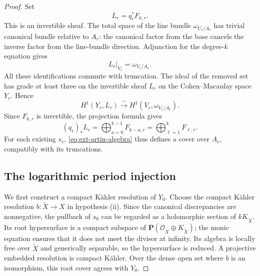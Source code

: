 \documentclass[11pt,a4paper]{article}
\theoremstyle{definition}\newtheorem{definition}[theorem]{Definition}
\theoremstyle{remark}\newtheorem*{remark}{Remark}
\newcommand{\OO}{\mathcal O}
\begin{document}
\begin{proof}
Set
\begin{equation}\label{eq:ext-top-line}
 L_r=q_r^*F_{k,r}.
\end{equation}
This is an invertible sheaf. The total space of the line bundle
$\omega_{U_r/A_r}$ has trivial canonical bundle relative to $A_r$:
the canonical factor from the base cancels the inverse factor from the
line-bundle direction. Adjunction for the degree-$k$ equation gives
\begin{equation}\label{eq:ext-adjunction}
 L_r|_{V_r}=\omega_{V_r/A_r}.
\end{equation}
All these identifications commute with truncation.
The ideal of the removed set has grade at least three on the invertible
sheaf $L_r$ on the Cohen--Macaulay space $Y_r$. Hence
\begin{equation}\label{eq:ext-depth-cover}
 H^1(Y_r,L_r)\xrightarrow{\ \sim\ }
 H^1(V_r,\omega_{V_r/A_r}).
\end{equation}
Since $F_{k,r}$ is invertible, the projection formula gives
\begin{equation}\label{eq:ext-top-direct-sum}
 (q_r)_*L_r
 =\bigoplus_{a=0}^{k-1}F_{k-a,r}
 =\bigoplus_{\ell=1}^{k}F_{\ell,r}.
\end{equation}
For each existing $s_r$, \eqref{eq:ext-artin-algebra} thus defines a cover
over $A_r$, compatibly with its truncations.

\subsection{The logarithmic period injection}

We first construct a compact Kähler resolution of $Y_0$.
Choose the compact Kähler resolution $b:\widetilde X\to X$
in hypothesis \textup{(ii)}.
Since the canonical discrepancies are nonnegative, the pullback of
$s_0$ can be regarded as a holomorphic section of $kK_{\widetilde X}$.
Its root hypersurface is a compact subspace of
$\mathbf P(\OO_{\widetilde X}\oplus K_{\widetilde X})$;
the monic equation ensures that it does not meet the divisor at infinity.
Its algebra is locally free over $\widetilde X$ and generically separable,
so the hypersurface is reduced. A projective embedded resolution is
compact Kähler. Over the dense open set where $b$ is an isomorphism,
this root cover agrees with $Y_0$.


\end{proof}
\end{document}
